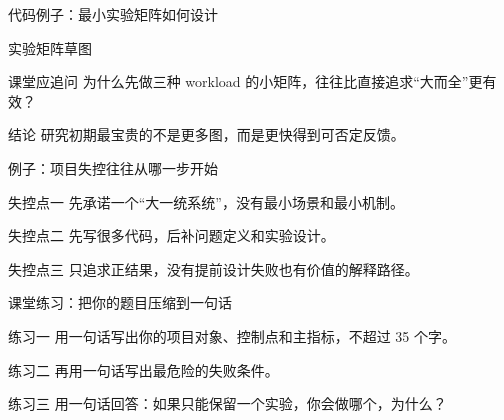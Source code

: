 \begin{frame}{代码例子：最小实验矩阵如何设计}
  \begin{block}{实验矩阵草图}
    {\ttfamily\small
    \par
    \par
    \par
    }
  \end{block}
  \pause
  \begin{block}{课堂应追问}
    为什么先做三种 workload 的小矩阵，往往比直接追求“大而全”更有效？
  \end{block}
  \pause
  \begin{block}{结论}
    研究初期最宝贵的不是更多图，而是更快得到可否定反馈。
  \end{block}
\end{frame}

\begin{frame}{例子：项目失控往往从哪一步开始}
  \begin{block}{失控点一}
    先承诺一个“大一统系统”，没有最小场景和最小机制。
  \end{block}
  \pause
  \begin{block}{失控点二}
    先写很多代码，后补问题定义和实验设计。
  \end{block}
  \pause
  \begin{block}{失控点三}
    只追求正结果，没有提前设计失败也有价值的解释路径。
  \end{block}
\end{frame}

\begin{frame}{课堂练习：把你的题目压缩到一句话}
  \begin{block}{练习一}
    用一句话写出你的项目对象、控制点和主指标，不超过 35 个字。
  \end{block}
  \pause
  \begin{block}{练习二}
    再用一句话写出最危险的失败条件。
  \end{block}
  \pause
  \begin{block}{练习三}
    用一句话回答：如果只能保留一个实验，你会做哪个，为什么？
  \end{block}
\end{frame}
